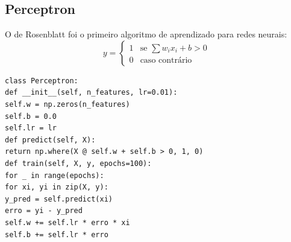\subsection{Perceptron}
O  de Rosenblatt \cite{rosenblatt1958perceptron} foi
o primeiro algoritmo de aprendizado para redes neurais:
\[y = \begin{cases}
1 & \text{se } \sum w_i x_i + b > 0 \\
0 & \text{caso contrário}
\end{cases}
\]
\begin{lstlisting}[style=pythonstyle]
class Perceptron:
def __init__(self, n_features, lr=0.01):
self.w = np.zeros(n_features)
self.b = 0.0
self.lr = lr
def predict(self, X):
return np.where(X @ self.w + self.b > 0, 1, 0)
def train(self, X, y, epochs=100):
for _ in range(epochs):
for xi, yi in zip(X, y):
y_pred = self.predict(xi)
erro = yi - y_pred
self.w += self.lr * erro * xi
self.b += self.lr * erro
\end{lstlisting}
